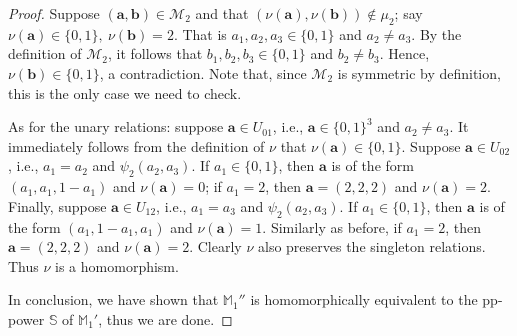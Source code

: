 \documentclass[10pt,a4paper]{amsart}
\begin{document}
\begin{proof}
Suppose $(\boldsymbol{a},\boldsymbol{b})\in \mathcal M_2$ and that $(\nu(\boldsymbol{a}),\nu(\boldsymbol{b}))\notin\mu_2$; say $\nu(\boldsymbol{a})\in\{0,1\},\ \nu(\boldsymbol{b})=2$. That is $a_1,a_2,a_3\in\{0,1\}$ and $a_2\neq a_3$. By the definition of $\mathcal M_2$, it follows that $b_1,b_2,b_3\in\{0,1\}$ and $b_2\neq b_3$. Hence, $\nu(\boldsymbol{b})\in\{0,1\}$, a contradiction. Note that, since $\mathcal M_2$ is symmetric by definition, this is the only case we need to check.

As for the unary relations: suppose $\boldsymbol{a}\in U_{01}$, i.e., $\boldsymbol{a}\in\{0,1\}^3$ and $a_2\neq a_3$. It immediately follows from the definition of $\nu$ that $\nu(\boldsymbol{a})\in\{0,1\}$. Suppose $\boldsymbol{a}\in U_{02}$, i.e., $a_1=a_2$ and $\psi_2(a_2,a_3)$. If $a_1\in\{0,1\}$, then $\boldsymbol{a}$ is of the form $(a_1,a_1,1-a_1)$ and $\nu(\boldsymbol{a})=0$; if $a_1=2$, then $\boldsymbol{a}=(2,2,2)$ and $\nu(\boldsymbol{a})=2$. Finally, suppose $\boldsymbol{a}\in U_{12}$, i.e., $a_1=a_3$ and $\psi_2(a_2,a_3)$. If $a_1\in\{0,1\}$, then $\boldsymbol{a}$ is of the form $(a_1,1-a_1,a_1)$ and $\nu(\boldsymbol{a})=1$. Similarly as before, if $a_1=2$, then $\boldsymbol{a}=(2,2,2)$ and $\nu(\boldsymbol{a})=2$. Clearly $\nu$ also preserves the singleton relations. Thus $\nu$ is a homomorphism.

In conclusion, we have shown that $\mathbb M_1''$ is homomorphically equivalent to the pp-power $\mathbb S$ of $\mathbb M_1'$, thus we are done.
\end{proof}
\end{document}

